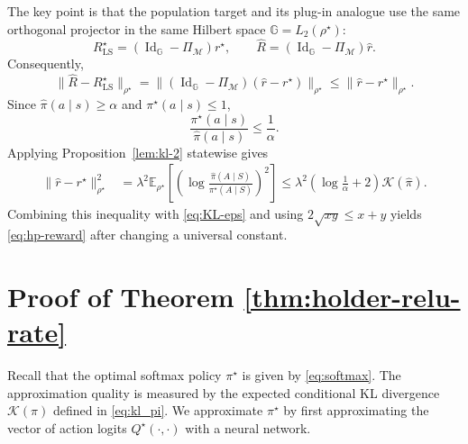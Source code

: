 \documentclass{article}
\theoremstyle{definition}
\theoremstyle{remark}
\theoremstyle{plain}
\newcommand{\E}{\mathbb{E}}
\numberwithin{equation}{section}
\begin{document}
The key point is that the population target and its plug-in analogue use the same orthogonal projector in the same Hilbert space $\mathbb G=L_2(\rho^\star)$:
\[
    R_{\mathrm{LS}}^\star
    =
    (\operatorname{Id}_{\mathbb G}-\Pi_{\mathcal M})r^\star,
    \qquad
    \widehat R
    =
    (\operatorname{Id}_{\mathbb G}-\Pi_{\mathcal M})\widehat r.
\]
Consequently,
\begin{equation}
\label{eq:projection-contraction-reward}
    \|\widehat R-R_{\mathrm{LS}}^\star\|_{\rho^\star}
    = \|(\operatorname{Id}_{\mathbb G}-\Pi_{\mathcal M})(\widehat r - r^\star) \|_{\rho^\star}\leq
    \|\widehat r-r^\star\|_{\rho^\star}.
\end{equation}
Since $\widehat\pi(a\mid s)\geq\alpha$ and $\pi^\star(a\mid s)\leq1$,
\[
    \frac{\pi^\star(a\mid s)}{\widehat\pi(a\mid s)}\leq\frac1\alpha.
\]
Applying Proposition~\ref{lem:kl-2} statewise gives
\begin{align}
    \|\widehat r-r^\star\|_{\rho^\star}^2
    &=
    \lambda^2\E_{\rho^\star}
    \left[
        \left(
            \log\frac{\widehat\pi(A\mid S)}{\pi^\star(A\mid S)}
        \right)^2
    \right]\leq
\lambda^2\left(\log\frac1\alpha+2\right)
    \mathcal{K}(\widehat \pi).
\end{align}
Combining this inequality with \eqref{eq:KL-eps} and using
$2\sqrt{xy}\leq x+y$ yields \eqref{eq:hp-reward} after changing a universal constant.

\section{Proof of Theorem \ref{thm:holder-relu-rate}}
\label{app:proof-holder-relu}
Recall that the optimal softmax policy \(\pi^\star\) is given by \eqref{eq:softmax}.  The approximation quality is measured by the expected conditional KL divergence \(\mathcal K(\pi)\) defined in \eqref{eq:kl_pi}.  We approximate \(\pi^\star\) by first approximating the vector of action logits \(Q^\star(\cdot,\cdot)\) with a neural network.
\end{document}
